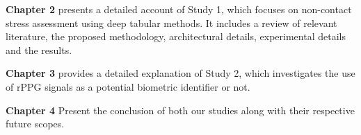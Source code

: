 \textbf{Chapter 2} presents a detailed account of Study 1, which focuses on non-contact stress assessment using deep tabular methods. It includes a review of relevant literature, the proposed methodology, architectural details,   experimental details and  the results.

\textbf{Chapter 3}  provides a detailed explanation of Study 2, which investigates the use of rPPG signals as a potential biometric identifier or not.

\textbf{Chapter 4}  Present the conclusion of both our studies along with their respective future scopes.


